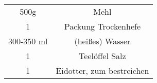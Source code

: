 \begin{tabular}{c | c}
	500g & Mehl \\
	1 &  Packung Trockenhefe \\
	300-350 ml & (heißes) Wasser \\
	1 & Teelöffel Salz \\
	1 & Eidotter, zum bestreichen\\
\end{tabular}